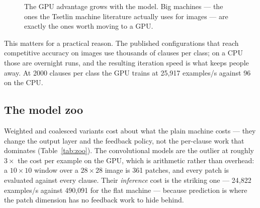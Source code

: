 \begin{figure}[htbp]
\centering

\caption{The GPU advantage grows with the model. Big machines --- the ones the Tsetlin machine
  literature actually uses for images --- are exactly the ones worth moving to a GPU.}
\label{fig:bench-scale}
\end{figure}

This matters for a practical reason. The published configurations that reach competitive
accuracy on images use thousands of clauses per class; on a CPU those are overnight runs, and
the resulting iteration speed is what keeps people away. At 2000 clauses per class the GPU
trains at 25{,}917 examples/s against 96 on the CPU.

\subsection{The model zoo}

Weighted and coalesced variants cost about what the plain machine costs --- they change the
output layer and the feedback policy, not the per-clause work that dominates
(Table~\ref{tab:zoo}). The convolutional models are the outlier at roughly $3\times$ the cost
per example on the GPU, which is arithmetic rather than overhead: a $10\times10$ window over a
$28\times28$ image is 361 patches, and every patch is evaluated against every clause. Their
\emph{inference} cost is the striking one --- 24{,}822 examples/s against 490{,}091 for the
flat machine --- because prediction is where the patch dimension has no feedback work to hide
behind.

